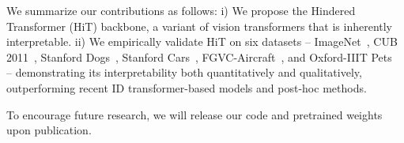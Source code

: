 We summarize our contributions as follows: i) We propose the Hindered Transformer (HiT) backbone, a variant of vision transformers that is inherently interpretable. ii) We empirically validate HiT on six datasets -- ImageNet~\cite{deng2009imagenet}, CUB 2011~\cite{WahCUB_200_2011}, Stanford Dogs~\cite{KhoslaYaoJayadevaprakashFeiFei_FGVC2011}, Stanford Cars~\cite{krause20133d}, FGVC-Aircraft~\cite{maji13fine-grained}, and Oxford-IIIT Pets~\cite{parkhi12a} -- demonstrating its interpretability both quantitatively and qualitatively, outperforming recent ID transformer-based models and post-hoc methods.

To encourage future research, we will release our code and pretrained weights upon publication.


